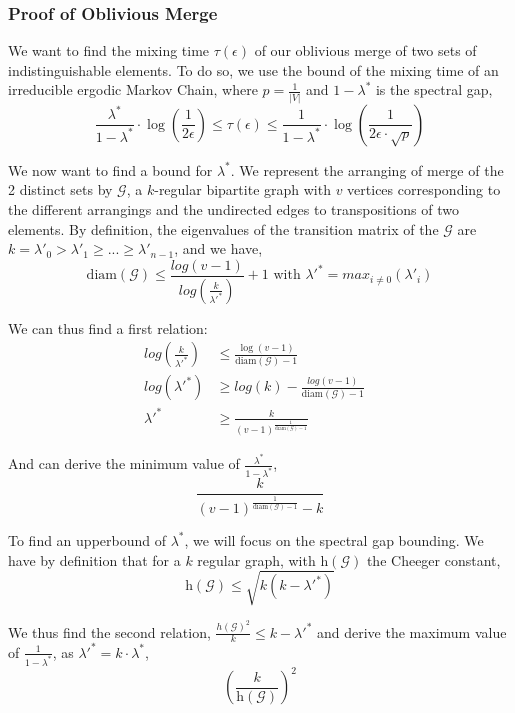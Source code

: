 \documentclass[conference]{IEEEtran}
\begin{document}
\subsubsection{Proof of Oblivious Merge}
\label{proofOM}

We want to find the mixing time $\tau(\epsilon)$ of our oblivious merge of two sets of indistinguishable elements. To do so, we use the bound of the mixing time of an irreducible ergodic Markov Chain, where $p = \frac{1}{|V|}$ and $1-\lambda^*$ is the spectral gap,
$$\frac{\lambda^*}{1-\lambda^*} \cdot \log\left(\frac{1}{2 \epsilon} \right)\leq \tau(\epsilon) \leq \frac{1}{1-\lambda^*}\cdot \log \left( \frac{1}{2 \epsilon \cdot \sqrt{p}}\right) $$

We now want to find a bound for $\lambda^*$. We represent the arranging of merge of the 2 distinct sets by $\mathcal{G}$, a $k$-regular bipartite graph with $v$ vertices corresponding to the different arrangings and the undirected edges to transpositions of two elements.
By definition, the eigenvalues of the transition matrix of the $\mathcal{G}$ are $k={\lambda'}_0 > {\lambda'}_1 \geq  ... \geq {\lambda'}_{n-1}$, and we have,
$$\text{diam}\left( \mathcal{G}\right) \leq \frac{log(v-1)}{log(\frac{k}{{\lambda'}^*})}+1 \text{ with } {\lambda'}^* = max_{i\neq0}({\lambda'}_i)$$

We can thus find a first relation:
\begin{align*}
log(\frac{k}{{\lambda'}^*}) &\leq\frac{\log(v-1)}{\text{diam}\left(\mathcal{G}\right)-1}&\\
log({{\lambda'}^*}) &\geq log(k) - \frac{log(v-1)}{\text{diam}\left(\mathcal{G}\right)-1}&\\
{\lambda'}^* &\geq \frac{k}{(v-1)^{\frac{1}{\text{diam}\left(\mathcal{G}\right)-1}}}
\end{align*}

And can derive the minimum value of $\frac{\lambda^*}{1-\lambda^*}$,
$$\frac{k}{(v-1)^{\frac{1}{\text{diam}\left(\mathcal{G}\right)-1}}-k}$$

To find an upperbound of $\lambda^*$, we will focus on the spectral gap bounding.
We have by definition that for a $k$ regular graph, with $\text{h} \left ( \mathcal{G} \right ) $ the Cheeger constant,
$$ \text{h} \left (\mathcal{G}\right) \leq \sqrt{k(k−{\lambda'}^*)}$$

We thus find the second relation,
$\frac{h\left (\mathcal{G}\right)^2}{k} \leq k-{\lambda'}^*$ and derive the maximum value of $\frac{1}{1-\lambda^*}$, as ${\lambda'}^* = k\cdot \lambda^*$,
$$\left ( \frac{k}{\text{h}\left (\mathcal{G}\right)} \right )^2$$
\end{document}
